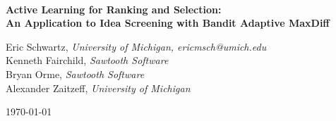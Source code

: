 \documentclass[a4paper,12pt]{article}
\newcommand{\titleofthispaper}{
	\textbf{Active Learning for Ranking and Selection: \\
	An Application to Idea Screening with Bandit Adaptive MaxDiff} 
}
\begin{document}

\begin{center}

	~ \\

	\vspace{2in}

	\titleofthispaper

	\vspace{1in}

	{Eric Schwartz,}
	\emph{University of Michigan, {ericmsch@umich.edu} } \\
	{Kenneth Fairchild,} 
	\emph{Sawtooth Software} \\
	{Bryan Orme,}
	\emph{Sawtooth Software} \\
	{Alexander Zaitzeff,}
	\emph{University of Michigan} 

	\vspace{1in}

	\today


\end{center}
\newpage






\end{document}
